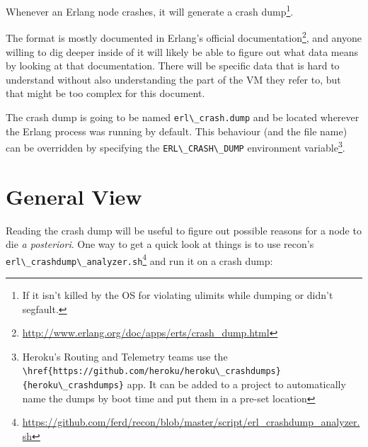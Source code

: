 \documentclass[11pt, oneside]{book}   	%
\newcommand{\filename}[1]{\Verb`#1`}
\newcommand{\app}[1]{\Verb`#1`}
\newcommand{\otpapp}[1]{\Verb`#1`}
\newcommand{\command}[1]{\Verb`#1`}
\begin{document}
Whenever an Erlang node crashes, it will generate a crash dump\footnote{If it isn't killed by the OS for violating ulimits while dumping or didn't segfault.}.

The format is mostly documented in Erlang's official documentation\footnote{\href{http://www.erlang.org/doc/apps/erts/crash\_dump.html}{http://www.erlang.org/doc/apps/erts/crash\_dump.html}}, and anyone willing to dig deeper inside of it will likely be able to figure out what data means by looking at that documentation. There will be specific data that is hard to understand without also understanding the part of the VM they refer to, but that might be too complex for this document.

The crash dump is going to be named \filename{erl\_crash.dump} and be located wherever the Erlang process was running by default. This behaviour (and the file name) can be overridden by specifying the \command{ERL\_CRASH\_DUMP} environment variable\footnote{Heroku's Routing and Telemetry teams use the \otpapp{\href{https://github.com/heroku/heroku\_crashdumps}{heroku\_crashdumps}} app. It can be added to a project to automatically name the dumps by boot time and put them in a pre-set location}.

\section{General View}

Reading the crash dump will be useful to figure out possible reasons for a node to die \emph{a posteriori}. One way to get a quick look at things is to use recon's \app{erl\_crashdump\_analyzer.sh}\footnote{\href{https://github.com/ferd/recon/blob/master/script/erl\_crashdump\_analyzer.sh}{https://github.com/ferd/recon/blob/master/script/erl\_crashdump\_analyzer.sh}} and run it on a crash dump:
\end{document}
